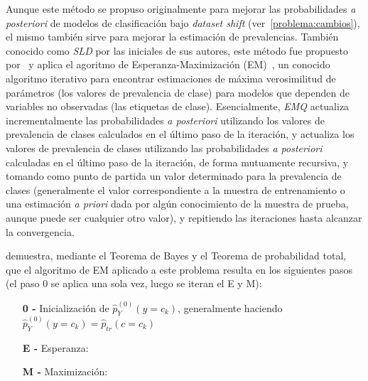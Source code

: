 Aunque este método se propuso originalmente para mejorar las probabilidades {\it
a posteriori\/} de modelos de clasificación bajo {\it dataset shift\/}
(ver~\ref{problema:cambios}), el mismo también sirve para mejorar la estimación
de prevalencias. También conocido como {\it SLD\/} por las iniciales de sus
autores, este método fue propuesto por~\citet{saerens2002adjusting} y aplica el
agoritmo de Esperanza-Maximización (EM)~\cite{dempster1977maximum}, un conocido
algoritmo iterativo para encontrar estimaciones de máxima verosimilitud de
parámetros (los valores de prevalencia de clase) para modelos que dependen de
variables no observadas (las etiquetas de clase). Esencialmente, {\it EMQ\/}
actualiza incrementalmente las probabilidades {\it a posteriori\/} utilizando
los valores de prevalencia de clases calculados en el último paso de la
iteración, y actualiza los valores de prevalencia de clases utilizando las
probabilidades {\it a posteriori\/} calculadas en el último paso de la
iteración, de forma mutuamente recursiva, y tomando como punto de partida un
valor determinado para la prevalencia de clases (generalmente el valor
correspondiente a la muestra de entrenamiento o una estimación {\it a priori\/}
dada por algún conocimiento de la muestra de prueba, aunque puede ser cualquier
otro valor), y repitiendo las iteraciones hasta alcanzar la convergencia.

\citet[Apéndice, p.23 a p.25]{saerens2002adjusting} demuestra, mediante el
Teorema de Bayes y el Teorema de probabilidad total, que el algoritmo de EM
aplicado a este problema resulta en los siguientes pasos (el paso 0 se aplica
una sola vez, luego se iteran el E y M):

\begin{enumerate}[leftmargin=*, labelindent=16pt]

    \item[\bf{0 -}] Inicialización de \(\hat p^{(0)}_{Y}(y=c_k)\), generalmente
    haciendo \(\hat p^{(0)}_{Y}(y=c_k) = \hat p_{tr}(c=c_k)\)

    \item[\bf{E -}] Esperanza: \hspace*{\fill}

    \item[\bf{M -}] Maximización: \hspace*{\fill}

\end{enumerate}

